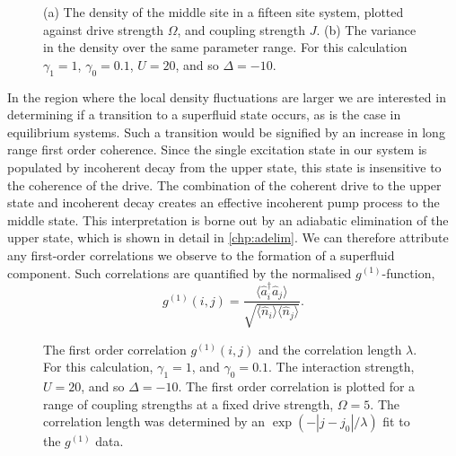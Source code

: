\begin{figure}[ht]
	 \hfill
	\caption{\label{fig:dnlca4-1} (a) The density of the middle site in a fifteen site system, plotted against drive strength \(\Omega\), and coupling strength \(J\). (b) The variance in the density over the same parameter range. For this calculation \(\gamma_{1} = 1\), \(\gamma_{0} = 0.1\), \(U = 20\), and so \(\Delta = -10\).}
\end{figure}

In the region where the local density fluctuations are larger we are interested in determining if a transition to a superfluid state occurs, as is the case in equilibrium systems. Such a transition would be signified by an increase in long range first order coherence. Since the single excitation state in our system is populated by incoherent decay from the upper state, this state is insensitive to the coherence of the drive. The combination of the coherent drive to the upper state and incoherent decay creates an effective incoherent pump process to the middle state. This interpretation is borne out by an adiabatic elimination of the upper state, which is shown in detail in \cref{chp:adelim}. We can therefore attribute any first-order correlations we observe to the formation of a superfluid component. Such correlations are quantified by the normalised \(g^{(1)}\)-function,
\begin{equation}
	g^{(1)}(i,j) = \frac{\langle \hat{a}_{i}^{\dagger} \hat{a}_{j} \rangle}{\sqrt{\langle \hat{n}_{i} \rangle \langle \hat{n}_{j} \rangle}}.
	\label{eq:dnlca4-1}
\end{equation}

\begin{figure}[ht]
	 \hfill
	\caption{\label{fig:dnlca4-2} The first order correlation \(g^{(1)}(i,j)\) and the correlation length $\lambda$. For this calculation, \(\gamma_{1} = 1\), and \(\gamma_{0} = 0.1\). The interaction strength, \(U = 20\), and so \(\Delta = -10\). The first order correlation is plotted for a range of coupling strengths at a fixed drive strength, \(\Omega = 5\). The correlation length was determined by an \(\exp(- |j-j_{0}|/\lambda)\) fit to the \(g^{(1)}\) data.}
\end{figure}


